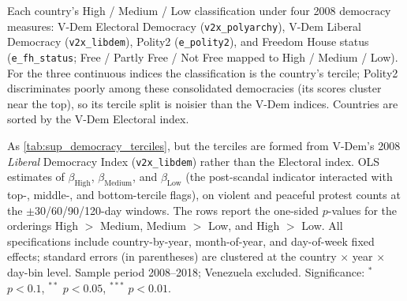 \documentclass[11pt]{article}
\let\mathbetasym\beta
\renewcommand{\beta}{\ensuremath{\mathbetasym}}
\begin{document}
\begin{table}[htb!]
    \caption{Country democracy classification across four indices.}
    \label{tab:sup_democracy_index_ranks}
    \begin{center}
        \small{}
    \end{center}
    \footnotesize{Each country's High / Medium / Low classification under four 2008 democracy measures: V-Dem Electoral Democracy (\texttt{v2x\_polyarchy}), V-Dem Liberal Democracy (\texttt{v2x\_libdem}), Polity2 (\texttt{e\_polity2}), and Freedom House status (\texttt{e\_fh\_status}; Free / Partly Free / Not Free mapped to High / Medium / Low). For the three continuous indices the classification is the country's tercile; Polity2 discriminates poorly among these consolidated democracies (its scores cluster near the top), so its tercile split is noisier than the V-Dem indices. Countries are sorted by the V-Dem Electoral index.}
\end{table}

\begin{table}[htb!]
    \caption{Effect by 2008 level of democracy, tercile split: V-Dem Liberal Democracy Index.}
    \label{tab:sup_democracy_terciles_libdem}
    \begin{center}
        \scriptsize{}
    \end{center}
    \footnotesize{As \autoref{tab:sup_democracy_terciles}, but the terciles are formed from V-Dem's 2008 \emph{Liberal} Democracy Index (\texttt{v2x\_libdem}) rather than the Electoral index. OLS estimates of $\beta_{\text{High}}$, $\beta_{\text{Medium}}$, and $\beta_{\text{Low}}$ (the post-scandal indicator interacted with top-, middle-, and bottom-tercile flags), on violent and peaceful protest counts at the $\pm$30/60/90/120-day windows. The rows report the one-sided $p$-values for the orderings High $>$ Medium, Medium $>$ Low, and High $>$ Low. All specifications include country-by-year, month-of-year, and day-of-week fixed effects; standard errors (in parentheses) are clustered at the country $\times$ year $\times$ day-bin level. Sample period 2008--2018; Venezuela excluded. Significance: $^{*}$ $p<0.1$, $^{**}$ $p<0.05$, $^{***}$ $p<0.01$.}
\end{table}
\end{document}
